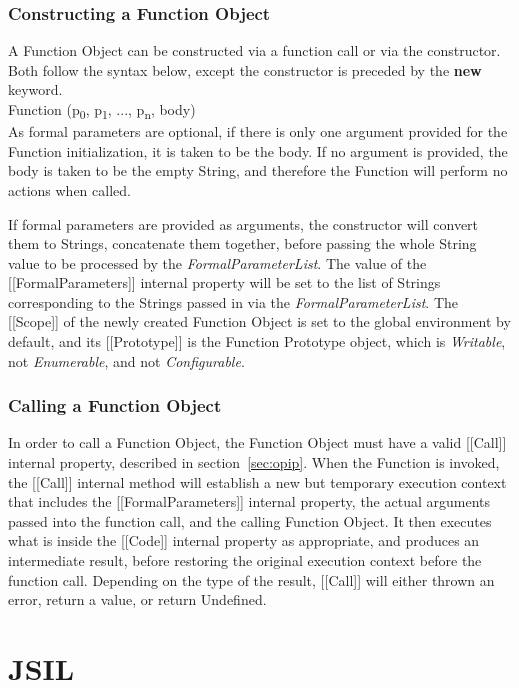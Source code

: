 \documentclass[a4paper,11pt,twoside]{report}
\begin{document}
\subsection{Constructing a Function Object}
A Function Object can be constructed via a function call or via the constructor. Both follow the syntax below, except the constructor is preceded by the \textbf{new} keyword. \\
\indent Function (p\textsubscript{0}, p\textsubscript{1}, ..., p\textsubscript{n}, body) \\
As formal parameters are optional, if there is only one argument provided for the Function initialization, it is taken to be the body. If no argument is provided, the body is taken to be the empty String, and therefore the Function will perform no actions when called.

If formal parameters are provided as arguments, the constructor will convert them to Strings, concatenate them together, before passing the whole String value to be processed by the \textit{FormalParameterList}. The value of the [[FormalParameters]] internal property will be set to the list of Strings corresponding to the Strings passed in via the \textit{FormalParameterList}. The [[Scope]] of the newly created Function Object is set to the global environment by default, and its [[Prototype]] is the Function Prototype object, which is \textit{Writable}, not \textit{Enumerable}, and not \textit{Configurable}.

\subsection{Calling a Function Object}
In order to call a Function Object, the Function Object must have a valid [[Call]] internal property, described in section~\ref{sec:opip}. When the Function is invoked, the [[Call]] internal method will establish a new but temporary execution context that includes the [[FormalParameters]] internal property, the actual arguments passed into the function call, and the calling Function Object. It then executes what is inside the [[Code]] internal property as appropriate, and produces an intermediate result, before restoring the original execution context before the function call. Depending on the type of the result, [[Call]] will either thrown an error, return a value, or return Undefined. 

\chapter{JSIL}\label{sec:jsil}
\end{document}
